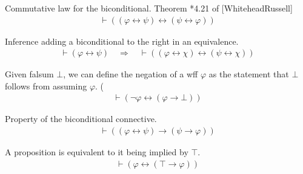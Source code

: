 \begin{lemma} Commutative law for the biconditional. 
Theorem *4.21 of [WhiteheadRussell] 
\begin{align}
\vdash ( ( \varphi \leftrightarrow \psi ) \leftrightarrow ( \psi
    \leftrightarrow \varphi ) )\label{eq:bicom}\tag{bicom}
\end{align}
\end{lemma}


\begin{lemma} Inference adding a biconditional to the
right in an equivalence.
\begin{align}
\vdash ( \varphi \leftrightarrow \psi )\quad\Rightarrow\quad \vdash ( ( \varphi
    \leftrightarrow \chi ) \leftrightarrow ( \psi \leftrightarrow \chi )
    )\label{eq:bibi1i}\tag{bibi1i}
\end{align}
\end{lemma}


\begin{lemma} Given falsum $\bot$, we can define the
negation of a wff $\varphi$ as the
     statement that $\bot$ follows from assuming $\varphi$.  (
\begin{align}
\vdash ( \lnot \varphi \leftrightarrow ( \varphi \rightarrow \bot )
    )\label{eq:dfnot}\tag{dfnot}
\end{align}
\end{lemma}


\begin{lemma} Property of the biconditional connective. 
\begin{align}
\vdash ( ( \varphi \leftrightarrow \psi ) \rightarrow ( \psi \rightarrow
    \varphi ) )\label{eq:biimpr}\tag{biimpr}
\end{align}
\end{lemma}


\begin{lemma} A proposition is equivalent to it being
implied by $\top$.  
\begin{align}
\vdash ( \varphi \leftrightarrow ( \top \rightarrow \varphi )
    )\label{eq:trut}\tag{trut}
\end{align}
\end{lemma}


